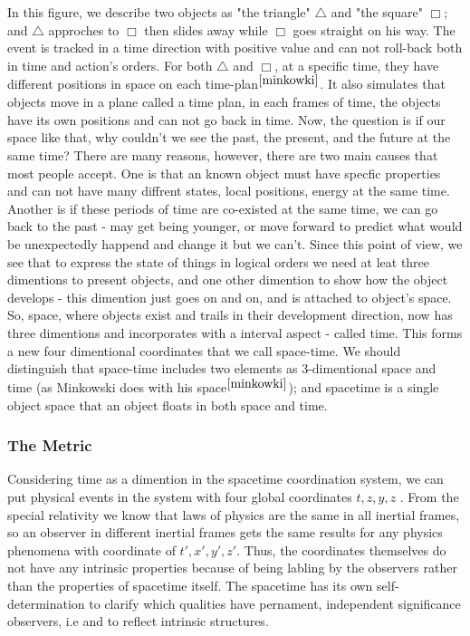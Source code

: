 \documentclass[11pt,a4paper]{article}
\begin{document}
	In this figure,  we describe two objects as "the triangle" $\textbf{$\triangle$}$ and  "the square" $\Box$; and $\triangle$ approches to $\Box$ then slides away while $\Box$ goes straight on his way. The event is tracked  in a time direction with positive value and can not roll-back both in time and action's orders. For both $\triangle$ and $\Box$, at a specific time, they have different positions in space on each time-plan$^{\cite{minkowki}}$.  It also simulates that objects move in a plane called a time plan, in each frames of time, the objects have its own positions and can not go back in time.  Now, the question is if our space like that, why couldn't we see the past, the present, and the future at the same time? There are many reasons, however, there are two main causes that most people accept. One is that an known object must have specfic properties and can not have many diffrent states, local positions, energy at the same time. Another is if these periods of time are co-existed at the same time, we can go back to  the past - may get being younger, or move forward to predict what would be unexpectedly happend and change it but we can't.  Since this point of view,  we see that to express the state of things in logical orders we need at leat three dimentions to present objects, and one other dimention to show how the object develops - this dimention just goes on and on, and is attached to object's space.  So, space, where objects exist and trails in their  development direction, now has three dimentions and incorporates with a interval aspect - called time. This forms a new four dimentional coordinates that we call space-time. We should distinguish that space-time includes two elements as 3-dimentional space and time (as Minkowski does with his space$^{\cite{minkowki}}$); and spacetime is a single object space that an object floats in both space and time.
	\subsubsection{The Metric}
	Considering  time as a dimention in the spacetime coordination system, we can put physical events in  the system with four global coordinates $t, z, y, z$ . From the special relativity we know that laws of physics are the same in all inertial frames, so an observer in different inertial frames gets the same results for any physics phenomena with coordinate of $t', x', y', z'$. Thus, the coordinates themselves do not have any intrinsic properties because of being labling by the observers rather than the properties of spacetime itself. The spacetime has its own self-determination to clarify which qualities have pernament, independent significance observers, i.e and to reflect intrinsic structures.
	
\end{document}
